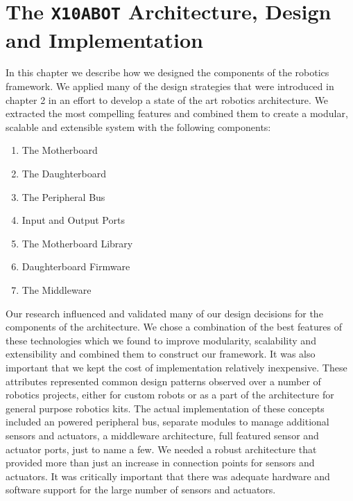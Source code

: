 \chapter{The \texttt{X10ABOT} Architecture, Design and Implementation}%
\label{cha:the_x10abot_architecture_design_and_implementation}


In this chapter we describe how we designed the components of the \xten robotics framework. We applied many of the design strategies that were introduced in chapter 2 in an effort to develop a state of the art robotics architecture. We extracted the most compelling features and combined them to create a modular, scalable and extensible system with the following components:
\begin{enumerate}
\item The Motherboard
\item The Daughterboard
\item The Peripheral Bus
\item Input and Output Ports
\item The Motherboard Library
\item Daughterboard Firmware
\item The Middleware
\end{enumerate}


Our research influenced and validated many of our design decisions for the components of the \xten architecture. We chose a combination of the best features of these technologies which we found to improve modularity, scalability and extensibility and combined them to construct our framework. It was also important that we kept the cost of implementation relatively inexpensive. These attributes represented common design patterns observed over a number of robotics projects, either for custom robots or as a part of the architecture for general purpose robotics kits. The actual implementation of these concepts included an \iic powered peripheral bus, separate modules to manage additional sensors and actuators, a middleware architecture, full featured sensor and actuator ports, just to name a few. We needed a robust architecture that provided more than just an increase in connection points for sensors and actuators. It was critically important that there was adequate hardware and software support for the large number of sensors and actuators.

